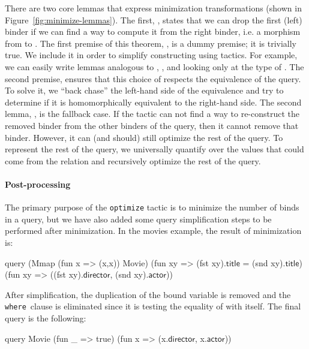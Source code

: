 \documentclass{sigplanconf}
\newcommand{\WHERE}{{\tt where}\relax\ifmmode\ \else\xspace\fi}
\begin{document}
There are two core lemmas that express minimization transformations (shown in Figure~\ref{fig:minimize-lemmas}).
The first, , states that we can drop the first (left) binder if we can find a way to compute it from the right binder, i.e. a morphism from  to .
The first premise of this theorem, , is a dummy premise; it is trivially true.
We include it in order to simplify constructing  using tactics.
For example, we can easily write lemmas analogous to , , and  looking only at the type of .
The second premise, ensures that this choice of  respects the equivalence of the query.
To solve it, we ``back chase'' the left-hand side of the equivalence and try to determine if it is homomorphically equivalent to the right-hand side.
The second lemma, , is the fallback case. %
If the tactic can not find a way to re-construct the removed binder from the other binders of the query, then it cannot remove that binder.
However, it can (and should) still optimize the rest of the query.
To represent the rest of the query, we universally quantify over the values that could come from the relation and recursively optimize the rest of the query.

\paragraph{Post-processing}
The primary purpose of the {\tt optimize} tactic is to minimize the number of binds in a query, but we have also added some query simplification steps to be performed after minimization.  In the movies example, the result of minimization is:
\begin{coq}
query (Mmap (fun x => (x,x)) Movie)
      (fun xy => (fst xy).$\textsf{title}$ = (snd xy).$\textsf{title}$)
      (fun xy => ((fst xy).$\textsf{director}$, (snd xy).$\textsf{actor}$))
\end{coq}
After simplification, the duplication of the bound variable is removed and the \WHERE clause is eliminated since it is testing the equality of  with itself.  The final query is the following:
\begin{coq}
query Movie (fun _ => true) (fun x => (x.$\textsf{director}$, x.$\textsf{actor}$))
\end{coq}
\end{document}
